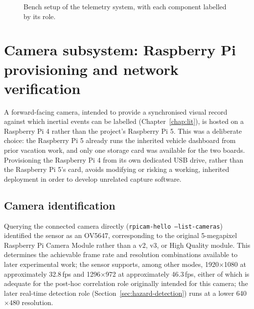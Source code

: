 \begin{figure}[htbp]
\caption{Bench setup of the telemetry system, with each component labelled by its role.}
\label{fig:bench-setup}
\end{figure}

\section[Camera subsystem]{Camera subsystem: Raspberry Pi provisioning and network verification}
\label{sec:pi-camera-provisioning}

A forward-facing camera, intended to provide a synchronised visual record against which inertial events can be labelled (Chapter~\ref{chap:lit}), is hosted on a Raspberry Pi 4 rather than the project's Raspberry Pi 5. This was a deliberate choice: the Raspberry Pi 5 already runs the inherited vehicle dashboard from prior vacation work, and only one storage card was available for the two boards. Provisioning the Raspberry Pi 4 from its own dedicated USB drive, rather than the Raspberry Pi 5's card, avoids modifying or risking a working, inherited deployment in order to develop unrelated capture software.

\subsection{Camera identification}

Querying the connected camera directly (\texttt{rpicam-hello --list-cameras}) identified the sensor as an OV5647, corresponding to the original 5-megapixel Raspberry Pi Camera Module rather than a v2, v3, or High Quality module. This determines the achievable frame rate and resolution combinations available to later experimental work; the sensor supports, among other modes, 1920$\times$1080 at approximately 32.8\,fps and 1296$\times$972 at approximately 46.3\,fps, either of which is adequate for the post-hoc correlation role originally intended for this camera; the later real-time detection role (Section~\ref{sec:hazard-detection}) runs at a lower 640$\times$480 resolution.

